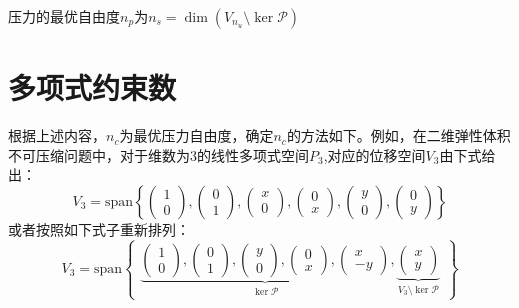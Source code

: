 压力的最优自由度$n_p$为$n_s = \dim(V_{n_u}\setminus \ker \mathcal P)$
\section{多项式约束数}

根据上述内容，$n_c$为最优压力自由度，确定$n_c$的方法如下。例如，在二维弹性体积不可压缩问题中，对于维数为3的线性多项式空间$P_3$,对应的位移空间$V_3$由下式给出：
\begin{equation}
    V_3 = \mathrm{span} \left \{
    \begin{pmatrix} 1 \\ 0 \end{pmatrix},
    \begin{pmatrix} 0 \\ 1 \end{pmatrix},
    \begin{pmatrix} x \\ 0 \end{pmatrix},
    \begin{pmatrix} 0 \\ x \end{pmatrix},
    \begin{pmatrix} y \\ 0 \end{pmatrix},
    \begin{pmatrix} 0 \\ y \end{pmatrix}
    \right \}
\end{equation}
或者按照如下式子重新排列：
\begin{equation}\label{base1}
    V_3 = \mathrm{span} 
    \begin{Bmatrix}
        \underbrace{
        \begin{pmatrix} 1 \\ 0 \end{pmatrix},
        \begin{pmatrix} 0 \\ 1 \end{pmatrix},
        \begin{pmatrix} y \\ 0 \end{pmatrix},
        \begin{pmatrix} 0 \\ x \end{pmatrix},
        \begin{pmatrix} x \\ -y \end{pmatrix}
        }_{\ker \mathcal P},
        \underbrace{
        \begin{pmatrix} x \\ y \end{pmatrix}
        }_{V_3\setminus \ker \mathcal P}
    \end{Bmatrix}
\end{equation}
